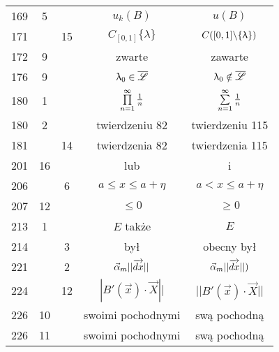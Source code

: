 \documentclass[a4paper,11pt]{article}
\begin{document}
\begin{center}
\begin{tabular}{|c|c|c|c|c|}
    169 &  5 & & $u_{ k }( B )$ & $u( B )$ \\
    171 & & 15 & $C_{ [ 0, 1 ] } \{ \lambda \}$
           & $C( [ 0, 1 ] \backslash \{ \uplambda \} )$ \\
    172 &  9 & & zwarte & zawarte \\
    176 &  9 & & $\uplambda_{ 0 } \in \overline{ \mathcal{L} }$
           & $\uplambda_{ 0 } \notin \overline{ \mathcal{L} }$ \\
    180 &  1 & & $\prod\limits^{ \infty }_{ n = 1 } \frac{ 1 }{ n }$
           & $\sum\limits^{ \infty }_{ n = 1 } \frac{ 1 }{ n }$ \\
    180 &  2 & & twierdzeniu 82 & twierdzeniu 115 \\
    181 & & 14 & twierdzenia 82 & twierdzenia 115 \\
    201 & 16 & & lub & i \\
    206 & &  6 & $a \leq x \leq a + \eta$ & $a < x \leq a + \eta$ \\
    207 & 12 & & $\leq 0$ & $\geq 0$ \\
    213 &  1 & & $E$ także & $E$ \\
    214 & &  3 & był & obecny był \\
    221 & &  2 & $\vec{ \alpha }_{ m } || \overrightarrow{ dx } ||$
           & $\vec{ \alpha }_{ m } || \overrightarrow{ dx } || )$ \\
    224 & & 12 & $| B'( \vec{ x } ) \cdot \vec{ X } ||$
           & $|| B'( \vec{ x } ) \cdot \vec{ X } ||$ \\
    226 & 10 & & swoimi pochodnymi & swą pochodną \\
    226 & 11 & & swoimi pochodnymi & swą pochodną \\
    \hline
  \end{tabular}


\end{center}
\end{document}
